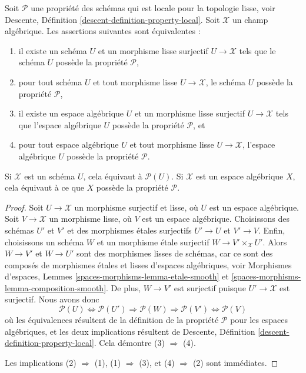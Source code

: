 \begin{lemma}
\label{lemma-type-property}
Soit $\mathcal{P}$ une propriété des schémas qui est locale pour la topologie
lisse, voir
Descente, Définition \ref{descent-definition-property-local}.
Soit $\mathcal{X}$ un champ algébrique. Les assertions suivantes sont équivalentes :
\begin{enumerate}
\item il existe un schéma $U$ et un morphisme lisse surjectif
$U \to \mathcal{X}$ tels que le schéma $U$ possède la propriété $\mathcal{P}$,
\item pour tout schéma $U$ et tout morphisme lisse $U \to \mathcal{X}$,
le schéma $U$ possède la propriété $\mathcal{P}$,
\item il existe un espace algébrique $U$ et un morphisme lisse surjectif
$U \to \mathcal{X}$ tels que l'espace algébrique $U$ possède la propriété $\mathcal{P}$, et
\item pour tout espace algébrique $U$ et tout morphisme lisse
$U \to \mathcal{X}$, l'espace algébrique $U$ possède la propriété $\mathcal{P}$.
\end{enumerate}
Si $\mathcal{X}$ est un schéma $U$, cela équivaut à $\mathcal{P}(U)$.
Si $\mathcal{X}$ est un espace algébrique $X$, cela équivaut à ce que
$X$ possède la propriété $\mathcal{P}$.
\end{lemma}

\begin{proof}
Soit $U \to \mathcal{X}$ un morphisme surjectif et lisse, où $U$ est un espace algébrique.
Soit $V \to \mathcal{X}$ un morphisme lisse, où $V$ est un espace algébrique.
Choisissons des schémas $U'$ et $V'$ et des morphismes \'etales surjectifs
$U' \to U$ et $V' \to V$. Enfin, choisissons un schéma $W$ et un
morphisme \'etale surjectif $W \to V' \times_\mathcal{X} U'$.
Alors $W \to V'$ et $W \to U'$ sont des morphismes lisses de schémas,
car ce sont des composés de morphismes \'etales et lisses d'espaces algébriques, voir
Morphismes d'espaces, Lemmes \ref{spaces-morphisms-lemma-etale-smooth} et
\ref{spaces-morphisms-lemma-composition-smooth}.
De plus, $W \to V'$ est surjectif puisque $U' \to \mathcal{X}$ est surjectif.
Nous avons donc
$$
\mathcal{P}(U) \Leftrightarrow
\mathcal{P}(U') \Rightarrow
\mathcal{P}(W) \Rightarrow
\mathcal{P}(V') \Leftrightarrow \mathcal{P}(V)
$$
où les équivalences résultent de la définition de la propriété $\mathcal{P}$ pour les
espaces algébriques, et les deux implications résultent de
Descente, Définition \ref{descent-definition-property-local}.
Cela démontre (3) $\Rightarrow$ (4).

\medskip\noindent
Les implications (2) $\Rightarrow$ (1), (1) $\Rightarrow$ (3),
et (4) $\Rightarrow$ (2) sont immédiates.
\end{proof}

